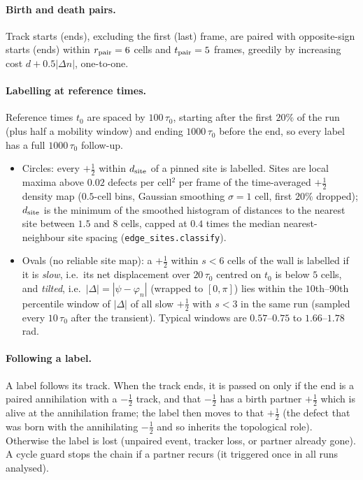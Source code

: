 \paragraph{Birth and death pairs.} Track starts (ends), excluding the first (last) frame, are paired with opposite-sign starts (ends)
within $r_{\rm pair}=6$ cells and $t_{\rm pair}=5$ frames, greedily by increasing cost $d+0.5|\Delta n|$, one-to-one.

\paragraph{Labelling at reference times.} Reference times $t_0$ are spaced by $100\,\tau_0$, starting after the first $20\%$ of the run (plus
half a mobility window) and ending $1000\,\tau_0$ before the end, so every label has a full $1000\,\tau_0$ follow-up.
\begin{itemize}
\item Circles: every $+\tfrac12$ within $d_{\rm site}$ of a pinned site is labelled. Sites are local maxima above $0.02$ defects per
  cell$^2$ per frame of the time-averaged $+\tfrac12$ density map ($0.5$-cell bins, Gaussian smoothing $\sigma=1$ cell, first $20\%$ dropped);
  $d_{\rm site}$ is the minimum of the smoothed histogram of distances to the nearest site between $1.5$ and $8$ cells, capped at $0.4$ times
  the median nearest-neighbour site spacing (\texttt{edge\_sites.classify}).
\item Ovals (no reliable site map): a $+\tfrac12$ within $s<6$ cells of the wall is labelled if it is \emph{slow}, i.e.\ its net
  displacement over $20\,\tau_0$ centred on $t_0$ is below $5$ cells, and \emph{tilted}, i.e.\ $|\Delta|=|\psi-\varphi_n|$ (wrapped to
  $[0,\pi]$) lies within the $10$th--$90$th percentile window of $|\Delta|$ of all slow $+\tfrac12$ with $s<3$ in the same run
  (sampled every $10\,\tau_0$ after the transient). Typical windows are $0.57$--$0.75$ to $1.66$--$1.78$ rad.
\end{itemize}

\paragraph{Following a label.} A label follows its track. When the track ends, it is passed on only if the end is a paired annihilation
with a $-\tfrac12$ track, and that $-\tfrac12$ has a birth partner $+\tfrac12$ which is alive at the annihilation frame; the label then
moves to that $+\tfrac12$ (the defect that was born with the annihilating $-\tfrac12$ and so inherits the topological role). Otherwise the
label is lost (unpaired event, tracker loss, or partner already gone). A cycle guard stops the chain if a partner recurs (it triggered once
in all runs analysed).

